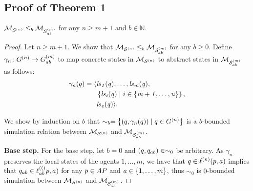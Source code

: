 \subsection*{Proof of Theorem 1}
\begin{customthm}{1}
$\mathcal{M}_{\mathcal{S}^{(n)}} \leq_b \mathcal{M}_{\mathcal{S}_{ab}^{(m)}}$ for any $n \geq m+1$ and $b \in \mathbb N$.
\end{customthm}
\begin{proof}
Let $n \geq m+1$. We show that $\mathcal{M}_{\mathcal{S}^{(n)}}
\leq_b \mathcal{M}_{\mathcal{S}_{ab}^{(m)}}$ for any $b \geq 0$.
 Define $\gamma_n
\colon G^{(n)} \rightarrow G^{(m)}_{ab}$ to map concrete states in
$\mathcal{M}_{\mathcal{S}^{(n)}}$ to abstract states in $\mathcal{M}_{\mathcal{S}_{ab}^{(m)}}$ as follows:
\begin{align*}
  \gamma_n(q) =  \langle &\it{ls}_{1}(q), \ldots, \it{ls}_{m}(q), \\
  &\left \{ \it{ls}_{i}(q) \mid i \in \left \{ m + 1, \ldots, n \right \} \right \}, \\
  &\it{ls}_{e}(q)  \rangle.
\end{align*}

We show by induction on $b$ that $\sim_b = \left \{ (q, \gamma_n(q)) \mid q \in
G^{(n)}  \right \}$ is a $b$-bounded simulation relation between $\mathcal{M}_{\mathcal{S}^{(n)}}$ and
$\mathcal{M}_{\mathcal{S}_{ab}^{(m)}}$. 


{\bf Base step.} For the base step, let $b = 0$ and $(q, q_{ab}) \in \sim_0$
be arbitrary. As $\gamma_n$ preserves the local states of the agents $1, \ldots,
m$, we have that $q \in \ell^{(n)}(p, a)$ implies that $q_{ab} \in
\ell^{(()}_{ab}p, a)$ for any $p \in \it{AP}$ and $a \in \left \{ 1, \ldots, m \right \}$, thus
$\sim_0$ is $0$-bounded simulation between $\mathcal{M}_{\mathcal{S}^{(n)}}$ and $\mathcal{M}_{\mathcal{S}_{ab}^{(m)}}$.  


\end{proof}
